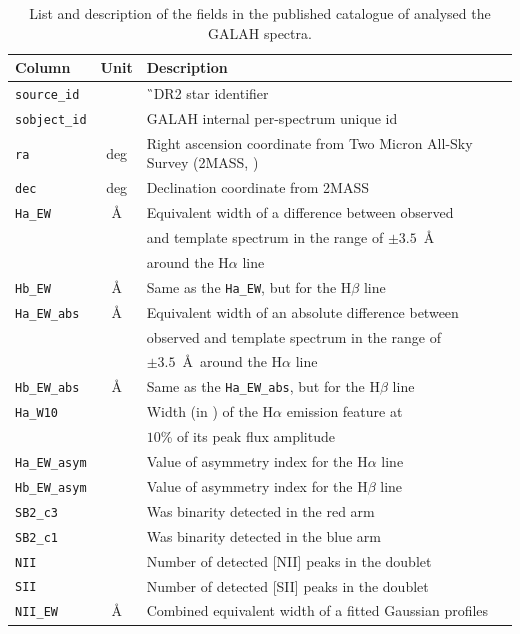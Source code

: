 \begin{table}
	\centering
	\caption{List and description of the fields in the published catalogue of analysed the GALAH spectra.}
	\label{tab:results}
	\begin{tabular}{l c l}
		\hline
		Column & Unit & Description \\
		\hline \hline
		\texttt{source\_id} & & \G\ DR2 star identifier \\
		\texttt{sobject\_id} & & GALAH internal per-spectrum unique id \\
		\texttt{ra} & deg & Right ascension coordinate from Two Micron All-Sky Survey (2MASS, \cite{2006AJ....131.1163S})\\
		\texttt{dec} & deg & Declination coordinate from 2MASS\\
		\texttt{Ha\_EW} & \AA & Equivalent width of a difference between observed \\
		& & and template spectrum in the range of $\pm3.5$~\AA\ \\
		& & around the H$\alpha$ line \\
		\texttt{Hb\_EW} & \AA & Same as the \texttt{Ha\_EW}, but for the H$\beta$ line \\
		\texttt{Ha\_EW\_abs} & \AA & Equivalent width of an absolute difference between \\
		& & observed and template spectrum in the range of \\
		& & $\pm3.5$~\AA\ around the H$\alpha$ line \\
		\texttt{Hb\_EW\_abs} & \AA & Same as the \texttt{Ha\_EW\_abs}, but for the H$\beta$ line\\
		\texttt{Ha\_W10} & \kms & Width (in \kms) of the H$\alpha$ emission feature at \\
		& & $10$\% of its peak flux amplitude \\
		\texttt{Ha\_EW\_asym} & & Value of asymmetry index for the H$\alpha$ line \\
		\texttt{Hb\_EW\_asym} & & Value of asymmetry index for the H$\beta$ line \\
		\texttt{SB2\_c3} & & Was binarity detected in the red arm \\
		\texttt{SB2\_c1} & & Was binarity detected in the blue arm \\
		\texttt{NII} & & Number of detected [NII] peaks in the doublet \\
		\texttt{SII} & & Number of detected [SII] peaks in the doublet \\
		\texttt{NII\_EW} & \AA & Combined equivalent width of a fitted Gaussian profiles \\

\end{tabular}
\end{table}

